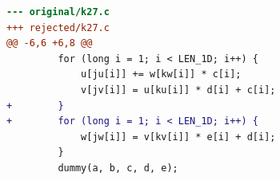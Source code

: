 \begin{lstlisting}[language=diff,basicstyle=\ttfamily\scriptsize,breaklines=true,caption={tsvc_c2/k27 — attempt 1 of 3, rejected by the gate at 'correctness': Program output changed — the patched program is NOT semantically equivalent to the original. / output differs and no numerical slack is in effect}]
--- original/k27.c
+++ rejected/k27.c
@@ -6,6 +6,8 @@
         for (long i = 1; i < LEN_1D; i++) {
             u[ju[i]] += w[kw[i]] * c[i];
             v[jv[i]] = u[ku[i]] * d[i] + c[i];
+        }
+        for (long i = 1; i < LEN_1D; i++) {
             w[jw[i]] = v[kv[i]] * e[i] + d[i];
         }
         dummy(a, b, c, d, e);
\end{lstlisting}
